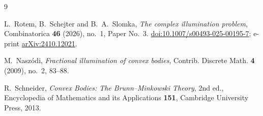 \documentclass[11pt]{amsart}
\theoremstyle{remark}
\begin{document}
\begin{thebibliography}{9}

L.~Rotem, B.~Schejter and B.~A.~Slomka,
\emph{The complex illumination problem},
Combinatorica \textbf{46} (2026), no.~1, Paper No.~3.
\href{https://doi.org/10.1007/s00493-025-00195-7}{doi:10.1007/s00493-025-00195-7};
e-print \href{https://arxiv.org/abs/2410.12021}{arXiv:2410.12021}.

M.~Nasz\'odi,
\emph{Fractional illumination of convex bodies},
Contrib. Discrete Math. \textbf{4} (2009), no.~2, 83--88.

R.~Schneider,
\emph{Convex Bodies: The Brunn--Minkowski Theory},
2nd ed., Encyclopedia of Mathematics and its Applications \textbf{151},
Cambridge University Press, 2013.

\end{thebibliography}
\end{document}
